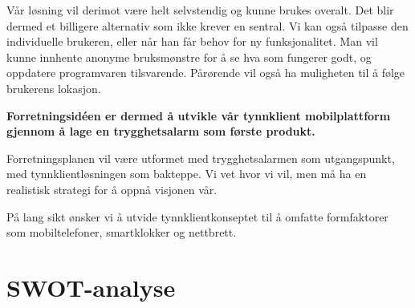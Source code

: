 Vår løsning vil derimot være helt selvstendig og kunne brukes overalt. Det blir
dermed et billigere alternativ som ikke krever en sentral. Vi kan også tilpasse
den individuelle brukeren, eller når han får behov for ny funksjonalitet. Man
vil kunne innhente anonyme bruksmønstre for å se hva som fungerer godt, og
oppdatere programvaren tilsvarende. Pårørende vil også ha muligheten til å
følge brukerens lokasjon.

\textbf{Forretningsidéen er dermed å utvikle vår tynnklient mobilplattform
gjennom å lage en trygghetsalarm som første produkt.}

Forretningsplanen vil være utformet med trygghetsalarmen som utgangspunkt, med
tynnklientløsningen som bakteppe. Vi vet hvor vi vil, men må ha en realistisk
strategi for å oppnå visjonen vår.

På lang sikt ønsker vi å utvide tynnklientkonseptet til å omfatte formfaktorer
som mobiltelefoner, smartklokker og nettbrett.

\clearpage

\section{SWOT-analyse}

